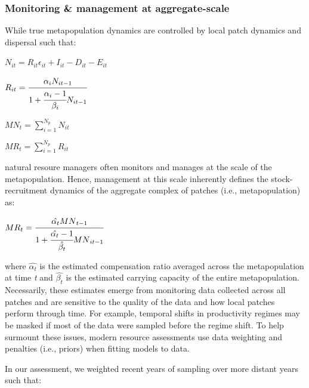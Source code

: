 \documentclass[]{article}
\begin{document}
\hypertarget{monitoring-management-at-aggregate-scale}{%
\subsubsection{Monitoring \& management at
aggregate-scale}\label{monitoring-management-at-aggregate-scale}}

While true metapopulation dynamics are controlled by local patch
dynamics and dispersal such that:

\(N_{it}= R_{it}\epsilon_{it}+I_{it}-D_{it}-E_{it}\)

\(R_{it}=\cfrac{\alpha_iN_{it-1}}{1+\cfrac{\alpha_i-1}{\beta_i}N_{it-1}}\)

\({MN}_t = \sum_{i=1}^{N_p} N_{it}\)

\({MR}_t = \sum_{i=1}^{N_p} R_{it}\)

natural resoure managers often monitors and manages at the scale of the
metapopulation. Hence, management at this scale inherently defines the
stock-recruitment dynamics of the aggregate complex of patches (i.e.,
metapopulation) as:

\({MR}_{t}=\cfrac{\hat{\alpha_t}{MN}_{t-1}}{1+\cfrac{\hat{\alpha_t}-1}{\hat{\beta_t}}{MN}_{it-1}}\)

where \(\hat{\alpha_t}\) is the estimated compensation ratio averaged
across the metapopulation at time \emph{t} and \(\hat{\beta_t}\) is the
estimated carrying capacity of the entire metapopulation. Necessarily,
these estimates emerge from monitoring data collected across all patches
and are sensitive to the quality of the data and how local patches
perform through time. For example, temporal shifts in productivity
regimes may be masked if most of the data were sampled before the regime
shift. To help surmount these issues, modern resource assessments use
data weighting and penalties (i.e., priors) when fitting models to data.

In our assessment, we weighted recent years of sampling over more
distant years such that:
\end{document}
